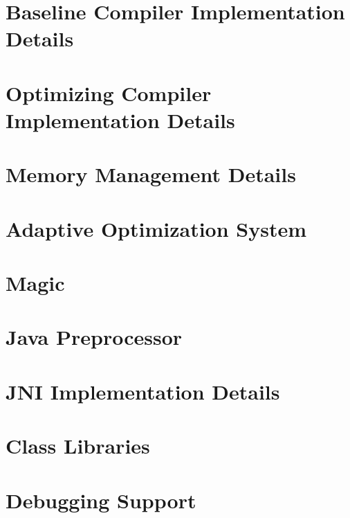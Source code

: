 \documentclass{article}
\begin{document}
\section{Baseline Compiler Implementation Details}
\label{section:basedetails}


\T \newpage
{}
\section{Optimizing Compiler Implementation Details}
\label{section:optdetails}


\T \newpage
{}
\section{Memory Management Details}
\label{section:JMTk}


\T \newpage
{}
\section{Adaptive Optimization System}
\label{section:aosdetails}


\T \newpage
{}
\section{Magic}


\T \newpage
{}
\section{Java Preprocessor}
\label{section:preprocessor}


\T \newpage
{}
\section{JNI Implementation Details}
\label{section:jni}


\T \newpage
{}
\section{Class Libraries}
\label{section:libraries}


\T \newpage
{}
\section{Debugging Support}
\label{section:debugging}

\end{document}
